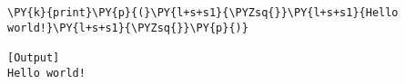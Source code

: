 \begin{Verbatim}[label=\makebox{\url{https://bitbucket.org/lbaldini/programming/src/tip/snippets/hello\_world.py}},commandchars=\\\{\}]
\PY{k}{print}\PY{p}{(}\PY{l+s+s1}{\PYZsq{}}\PY{l+s+s1}{Hello world!}\PY{l+s+s1}{\PYZsq{}}\PY{p}{)}

[Output]
Hello world!
\end{Verbatim}